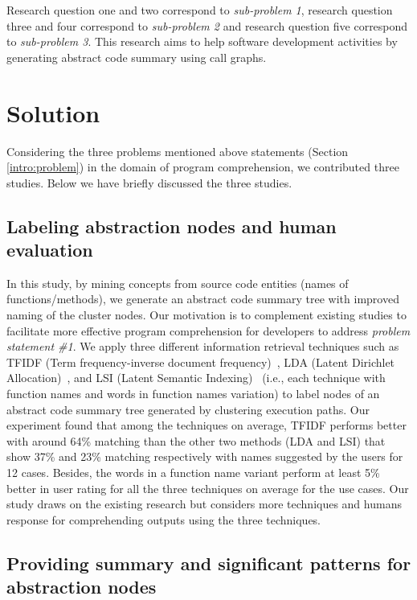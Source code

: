 Research question one and two correspond to \emph{sub-problem 1}, research question three and four correspond to \emph{sub-problem 2} and research question five correspond to \emph{sub-problem 3}. This research aims to help software development activities by generating abstract code summary using call graphs. 



\section{Solution}
\label{intro:solution}
Considering the three problems mentioned above statements (Section \ref{intro:problem}) in the domain of program comprehension, we contributed three studies. Below we have briefly discussed the three studies.  

\subsection{Labeling abstraction nodes and human evaluation}

In this study, by mining concepts from source code entities (names of functions/methods), we generate an abstract code summary tree
with improved naming of the cluster nodes. Our motivation is to complement existing studies to facilitate more effective program comprehension for
developers to address \emph{problem statement \#1}. We apply three different information retrieval techniques such as TFIDF (Term frequency-inverse document frequency)~\cite{ramos2003usingTfidfRelevance}, LDA (Latent  Dirichlet  Allocation)~\cite{blei2003latentLDA}, and LSI (Latent Semantic Indexing)~\cite{deerwester1990indexingLSI} (i.e., each technique with function
names and words in function names variation) to label nodes of an abstract code summary tree generated by clustering execution paths. Our experiment found that among the techniques on average, TFIDF performs better with around 64\% matching than the other
two methods (LDA and LSI) that show 37\% and 23\% matching respectively with names suggested by the users for 12 cases. Besides,
the words in a function name variant perform at least 5\% better in user rating for all the three techniques on average for the use cases.
Our study draws on the existing research but considers more techniques and humans response for comprehending outputs using the three
techniques.

\subsection{Providing summary and significant patterns for abstraction nodes}

